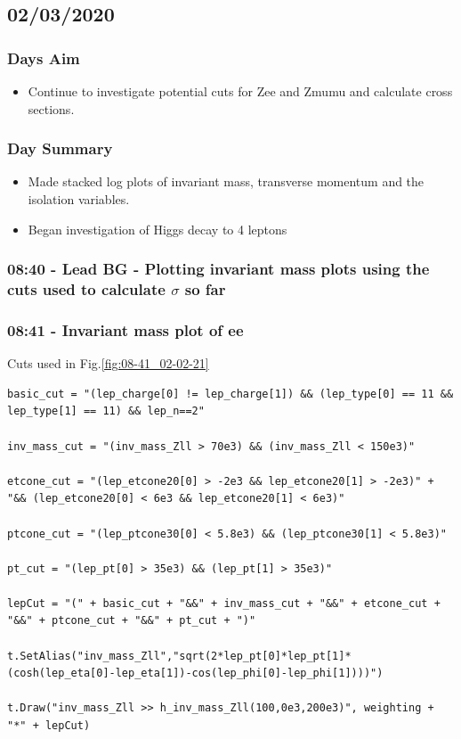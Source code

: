 \subsection*{\textbf{02/03/2020}}

\subsubsection{Days Aim}
\begin{itemize}
    \item Continue to investigate potential cuts for Zee and Zmumu and calculate cross sections.
\end{itemize}
\subsubsection{Day Summary}
\begin{itemize}
    \item Made stacked log plots of invariant mass, transverse momentum and the isolation variables.
    \item Began investigation of Higgs decay to 4 leptons
\end{itemize}


\subsubsection*{08:40 - Lead BG - Plotting invariant mass plots using the cuts used to calculate $\sigma$ so far}

\subsubsection*{08:41 - Invariant mass plot of ee}
Cuts used in Fig.\ref{fig:08-41_02-02-21}

\begin{lstlisting}
basic_cut = "(lep_charge[0] != lep_charge[1]) && (lep_type[0] == 11 && lep_type[1] == 11) && lep_n==2"

inv_mass_cut = "(inv_mass_Zll > 70e3) && (inv_mass_Zll < 150e3)"

etcone_cut = "(lep_etcone20[0] > -2e3 && lep_etcone20[1] > -2e3)" + "&& (lep_etcone20[0] < 6e3 && lep_etcone20[1] < 6e3)"

ptcone_cut = "(lep_ptcone30[0] < 5.8e3) && (lep_ptcone30[1] < 5.8e3)"

pt_cut = "(lep_pt[0] > 35e3) && (lep_pt[1] > 35e3)"
    
lepCut = "(" + basic_cut + "&&" + inv_mass_cut + "&&" + etcone_cut + "&&" + ptcone_cut + "&&" + pt_cut + ")"
    
t.SetAlias("inv_mass_Zll","sqrt(2*lep_pt[0]*lep_pt[1]*(cosh(lep_eta[0]-lep_eta[1])-cos(lep_phi[0]-lep_phi[1])))")
  
t.Draw("inv_mass_Zll >> h_inv_mass_Zll(100,0e3,200e3)", weighting + "*" + lepCut)
\end{lstlisting}

